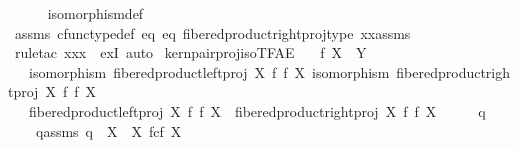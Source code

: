 \begin{isabellebody}
\ \ \ \ \isamarkupfalse%
\ isomorphism{\isacharunderscore}{\kern0pt}def\isanewline
\ \ \ \ \isamarkupfalse%
\ assms{\isacharparenleft}{\kern0pt}{}{\isacharparenright}{\kern0pt}\ cfunc{\isacharunderscore}{\kern0pt}type{\isacharunderscore}{\kern0pt}def\ eq{}\ eq{}\ fibered{\isacharunderscore}{\kern0pt}product{\isacharunderscore}{\kern0pt}right{\isacharunderscore}{\kern0pt}proj{\isacharunderscore}{\kern0pt}type\ xx{\isacharunderscore}{\kern0pt}assms{\isacharparenleft}{\kern0pt}{}{\isacharparenright}{\kern0pt}\isanewline
\ \ \ \ \isamarkupfalse%
\ {\isacharparenleft}{\kern0pt}rule{\isacharunderscore}{\kern0pt}tac\ x{\isacharequal}{\kern0pt}xx\ \ exI{\isacharcomma}{\kern0pt}\ auto{\isacharparenright}{\kern0pt}\isanewline
{}\isamarkupfalse%
%
\endisatagproof
{\isafoldproof}%
%
\isadelimproof
\isanewline
%
\endisadelimproof
\isanewline
{}\isamarkupfalse%
\ kern{\isacharunderscore}{\kern0pt}pair{\isacharunderscore}{\kern0pt}proj{\isacharunderscore}{\kern0pt}iso{\isacharunderscore}{\kern0pt}TFAE{}{\isacharcolon}{\kern0pt}\isanewline
\ \ \ {\isachardoublequoteopen}f{\isacharcolon}{\kern0pt}\ X\ {\isasymrightarrow}\ Y{\isachardoublequoteclose}\isanewline
\ \ \ {\isachardoublequoteopen}isomorphism\ {\isacharparenleft}{\kern0pt}fibered{\isacharunderscore}{\kern0pt}product{\isacharunderscore}{\kern0pt}left{\isacharunderscore}{\kern0pt}proj\ X\ f\ f\ X{\isacharparenright}{\kern0pt}{\isachardoublequoteclose}\ {\isachardoublequoteopen}isomorphism\ {\isacharparenleft}{\kern0pt}fibered{\isacharunderscore}{\kern0pt}product{\isacharunderscore}{\kern0pt}right{\isacharunderscore}{\kern0pt}proj\ X\ f\ f\ X{\isacharparenright}{\kern0pt}{\isachardoublequoteclose}\isanewline
\ \ \ {\isachardoublequoteopen}fibered{\isacharunderscore}{\kern0pt}product{\isacharunderscore}{\kern0pt}left{\isacharunderscore}{\kern0pt}proj\ X\ f\ f\ X\ {\isacharequal}{\kern0pt}\ fibered{\isacharunderscore}{\kern0pt}product{\isacharunderscore}{\kern0pt}right{\isacharunderscore}{\kern0pt}proj\ X\ f\ f\ X{\isachardoublequoteclose}\isanewline
%
\isadelimproof
%
\endisadelimproof
%
\isatagproof
{}\isamarkupfalse%
\ {\isacharminus}{\kern0pt}\isanewline
\ \ \isamarkupfalse%
\ q{}\ \ \isanewline
\ \ \ \ q{}{\isacharunderscore}{\kern0pt}assms{\isacharcolon}{\kern0pt}\ {\isachardoublequoteopen}q{}\ {\isacharcolon}{\kern0pt}\ X\ {\isasymrightarrow}\ X\ \isactrlbsub f\isactrlesub {\isasymtimes}\isactrlsub c\isactrlbsub f\isactrlesub \ X{\isachardoublequoteclose}\isanewline

\end{isabellebody}
